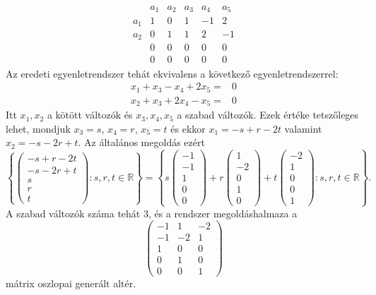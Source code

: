 \documentclass[a4paper, showtrims]{memoir}
\theoremstyle{plain}
\theoremstyle{remark}
\theoremstyle{definition}
\begin{document}
\begin{enumerate}
\begin{multline*}
\begin{array}{r|rrrrr}
			          & a_1 & a_2 & a_3 & a_4 & a_5 \\
			      \hline
			      a_1 & 1   & 0   & 1   & -1  & 2   \\
			      a_2 & 0   & 1   & 1   & 2   & -1  \\
			          & 0   & 0   & 0   & 0   & 0   \\
			          & 0   & 0   & 0   & 0   & 0
		      \end{array}
	      \end{multline*}
	      Az eredeti egyenletrendszer tehát ekvivalens a következő egyenletrendszerrel:
	      \[
		      \begin{array}{rl}
			      x_1+x_3-x_4+2x_5= & 0 \\
			      x_2+x_3+2x_4-x_5= & 0
		      \end{array}
	      \]
	      Itt $x_1,x_2$ a kötött változók és $x_3,x_4,x_5$ a szabad változók.
	      Ezek értéke tetszőleges lehet, mondjuk $x_3=s$, $x_4=r$, $x_5=t$ és ekkor
	      $x_1=-s+r-2t$ valamint $x_2=-s-2r+t$.
	      Az általános megoldás ezért
	      \[
		      \left\{
		      \begin{pmatrix}
			      -s+r-2t \\
			      -s-2r+t \\
			      s       \\
			      r       \\
			      t
		      \end{pmatrix}
		      :s,r,t\in\mathbb{R}
		      \right\}
		      =
		      \left\{ s
		      \begin{pmatrix}
			      -1 \\-1\\1\\0\\0
		      \end{pmatrix}
		      +
		      r
		      \begin{pmatrix}
			      1 \\-2\\0\\1\\0
		      \end{pmatrix}
		      +
		      t
		      \begin{pmatrix}
			      -2 \\1\\0\\0\\1
		      \end{pmatrix}
		      :s,r,t\in\mathbb{R}
		      \right\}.
	      \]
	      A szabad változók száma tehát $3$,
	      és a rendszer megoldáshalmaza a
	      \[
		      \begin{pmatrix}
			      -1 & 1  & -2 \\
			      -1 & -2 & 1  \\
			      1  & 0  & 0  \\
			      0  & 1  & 0  \\
			      0  & 0  & 1
		      \end{pmatrix}
	      \]
	      mátrix oszlopai generált altér.
\end{enumerate}
\end{document}
